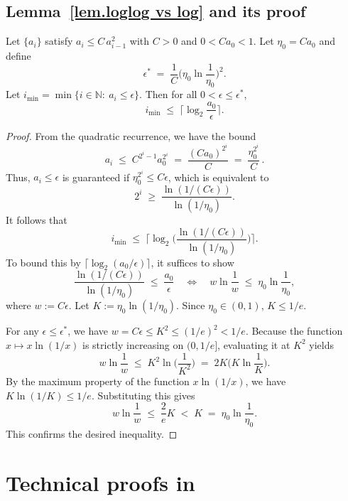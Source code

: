 \documentclass{article}
\begin{document}
\subsection*{Lemma~\ref{lem.loglog vs log} and its proof}
\begin{lemma}\label{lem.loglog vs log}
    Let $\{a_i\}$ satisfy $a_i \le C\,a_{i-1}^2$ with $C>0$ and $0<Ca_0<1$. Let $\eta_0 = Ca_0$ and define
    \[
        \epsilon^* \;=\; \frac{1}{C} \Big(\eta_0\ln\!\frac{1}{\eta_0}\Big)^2.
    \]
    Let $i_{\min} = \min\{i\in\mathbb{N}:\ a_i\le \epsilon\}$. Then for all $0 < \epsilon \leq \epsilon^*$,
    \[
        i_{\min}\;\le\;\Big\lceil \log_2\!\frac{a_0}{\epsilon}\Big\rceil.
    \]
\end{lemma}

\begin{proof}
    From the quadratic recurrence, we have the bound
    \[
        a_i \;\le\; C^{2^{i}-1} a_0^{2^{i}} \;=\; \frac{(C a_0)^{2^{i}}}{C} \;=\; \frac{\eta_0^{2^{i}}}{C}\,.
    \]
    Thus, $a_i\le\epsilon$ is guaranteed if $\eta_0^{2^{i}}\le C\epsilon$, which is equivalent to
    \[
        2^{i} \;\ge\; \frac{\ln(1/(C\epsilon))}{\ln(1/\eta_0)}.
    \]
    It follows that
    \[
        i_{\min}\;\le\;\Big\lceil \log_2\!\Big(\frac{\ln(1/(C\epsilon))}{\ln(1/\eta_0)}\Big)\Big\rceil.
    \]
    To bound this by $\lceil \log_2(a_0/\epsilon) \rceil$, it suffices to show
    \[
        \frac{\ln(1/(C\epsilon))}{\ln(1/\eta_0)} \;\le\; \frac{a_0}{\epsilon} \quad\Longleftrightarrow\quad w\ln\!\frac{1}{w}\;\le\;\eta_0\ln\!\frac{1}{\eta_0},
    \]
    where $w := C\epsilon$. Let $K := \eta_0\ln(1/\eta_0)$. Since $\eta_0 \in (0, 1)$, $K \le 1/e$.

    For any $\epsilon \le \epsilon^*$, we have $w = C\epsilon \le K^2 \le (1/e)^2 < 1/e$. Because the function $x \mapsto x\ln(1/x)$ is strictly increasing on $(0, 1/e]$, evaluating it at $K^2$ yields
    \[
        w\ln\!\frac{1}{w} \;\le\; K^2 \ln\!\Big(\frac{1}{K^2}\Big) \;=\; 2K \Big(K\ln\!\frac{1}{K}\Big).
    \]
    By the maximum property of the function $x\ln(1/x)$, we have $K\ln(1/K) \le 1/e$. Substituting this gives
    \[
        w\ln\!\frac{1}{w} \;\le\; \frac{2}{e}K \;<\; K \;=\; \eta_0\ln\!\frac{1}{\eta_0}.
    \]
    This confirms the desired inequality.
\end{proof}
\section{Technical proofs in~}\label{sec.appendix 2}
\end{document}
